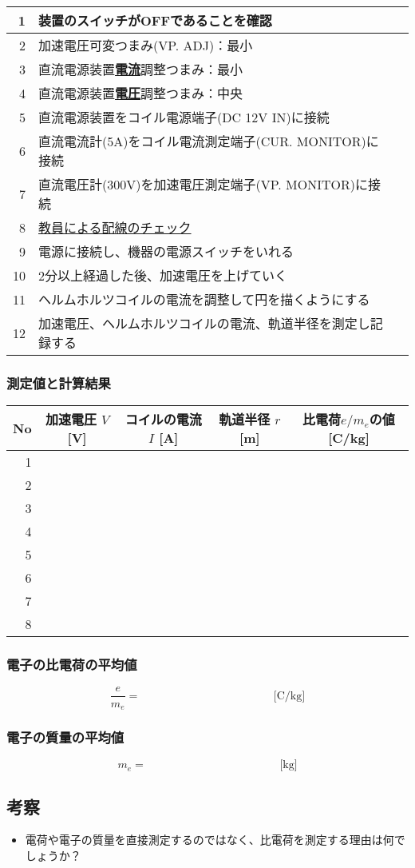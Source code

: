 \begin{tabular}{|r|p{14cm}|p{0.7cm}|}
\hline
1 & 装置のスイッチがOFFであることを確認 & \\
\hline
2 & 加速電圧可変つまみ(VP. ADJ)：最小 & \\
\hline
3 & 直流電源装置\underline{\bf 電流}調整つまみ：最小 & \\
\hline
4 & 直流電源装置\underline{\bf 電圧}調整つまみ：中央 &\\
\hline
5 & 直流電源装置をコイル電源端子(DC 12V IN)に接続 & \\ 
\hline
6 & 直流電流計(5A)をコイル電流測定端子(CUR. MONITOR)に接続 & \\
\hline
7 & 直流電圧計(300V)を加速電圧測定端子(VP. MONITOR)に接続 & \\
\hline
8 & \underline{教員による配線のチェック} &\\
\hline\hline
9 & 電源に接続し、機器の電源スイッチをいれる &\\
\hline
10 & 2分以上経過した後、加速電圧を上げていく &\\
\hline
11 & ヘルムホルツコイルの電流を調整して円を描くようにする  & \\
\hline
12 & 加速電圧、ヘルムホルツコイルの電流、軌道半径を測定し記録する  & \\
\hline
\end{tabular}



\subsubsection*{測定値と計算結果}

\hspace*{-\parindent}
\begin{tabular}{|r|c|c|c|c|}
\hline
No & 加速電圧 $V$ [V] & コイルの電流 $I$ [A] & 軌道半径 $r$ [m] & 比電荷$e/m_e$の値 [C/kg] \\
\hline\hline
1&&&&\\
\hline
2&&&&\\
\hline
3&&&&\\
\hline
4&&&&\\
\hline
5&&&&\\
\hline
6&&&&\\
\hline
7&&&&\\
\hline
8&&&&\\
\hline
\end{tabular}

\subsubsection*{電子の比電荷の平均値}

\[
\frac{e}{m_e} = \hspace{5cm} \text{[C/kg]}
\]

\subsubsection*{電子の質量の平均値}

\[
m_e = \hspace{5cm} \text{[kg]}
\]


\subsection*{考察}
\begin{itemize}
\item 電荷や電子の質量を直接測定するのではなく、比電荷を測定する理由は何でしょうか？
\end{itemize}

